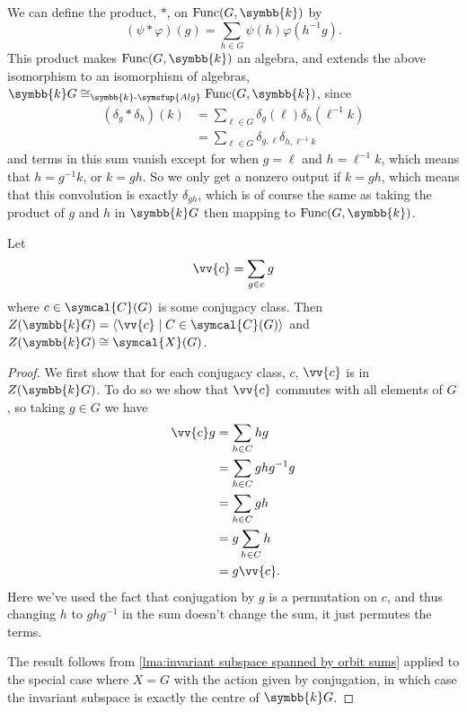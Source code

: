 \documentclass[fleqn]{NotesClass}
\makeatletter
\renewcommand{\field}{\symbb{k}}
\newcommand{\c@egory}[1]{\symsfup{#1}}
\newcommand{\Alg}[1][\field]{{#1}\text{-}\c@egory{Alg}}
\newcommand{\isomorphic}{\cong}
\newcommand{\classFunctions}{\symcal{X}}
\newcommand{\conjugacyClasses}{\symcal{C}}
\DeclareMathOperator{\Func}{Func}
\makeatother
\begin{document}
    We can define the  product, \(*\), on \(\Func(G, \field)\) by
    \begin{equation}
        (\psi * \varphi)(g) = \sum_{h \in G} \psi(h) \varphi(h^{-1}g).
    \end{equation}
    This product makes \(\Func(G, \field)\) an algebra, and extends the above isomorphism to an isomorphism of algebras, \(\field G \isomorphic_{\Alg} \Func(G, \field)\), since
    \begin{align}
        (\delta_g * \delta_h)(k) &= \sum_{\ell \in G} \delta_g(\ell) \delta_h(\ell^{-1}k)\\
        &= \sum_{\ell \in G} \delta_{g,\ell} \delta_{h,\ell^{-1}k}
    \end{align}
    and terms in this sum vanish except for when \(g = \ell\) and \(h = \ell^{-1}k\), which means that \(h = g^{-1}k\), or \(k = gh\).
    So we only get a nonzero output if \(k = gh\), which means that this convolution is exactly \(\delta_{gh}\), which is of course the same as taking the product of \(g\) and \(h\) in \(\field G\) then mapping to \(\Func(G, \field)\).
    
    \begin{prp}{}{}
        Let
        \begin{equation}
            \vv{c} = \sum_{g \in c} g
        \end{equation}
        where \(c \in \conjugacyClasses(G)\) is some conjugacy class.
        Then \(Z(\field G) = \langle \vv{c} \mid C \in \conjugacyClasses(G) \rangle\) and \(Z(\field G) \isomorphic \classFunctions(G)\).
        \begin{proof}
            We first show that for each conjugacy class, \(c\), \(\vv{c}\) is in \(Z(\field G)\).
            To do so we show that \(\vv{c}\) commutes with all elements of \(G\), so taking \(g \in G\) we have
            \begin{align}
                \vv{c}g &= \sum_{h \in C} hg\\
                &= \sum_{h \in C} ghg^{-1}g\\
                &= \sum_{h \in C} gh\\
                &= g \sum_{h \in C} h\\
                &= g\vv{c}. 
            \end{align}
            Here we've used the fact that conjugation by \(g\) is a permutation on \(c\), and thus changing \(h\) to \(ghg^{-1}\) in the sum doesn't change the sum, it just permutes the terms.
            
            The result follows from \cref{lma:invariant subspace spanned by orbit sums} applied to the special case where \(X = G\) with the action given by conjugation, in which case the invariant subspace is exactly the centre of \(\field G\).
        \end{proof}
    \end{prp}
    
\end{document}
